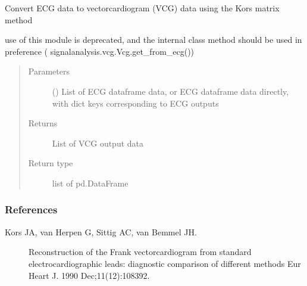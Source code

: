 \documentclass[letterpaper,10pt,english]{sphinxmanual}
\begin{document}
\begin{fulllineitems}
\label{\detokenize{_autosummary/signalanalysis.vcg.get_vcg_from_ecg:signalanalysis.vcg.get_vcg_from_ecg}}
\sphinxAtStartPar
Convert ECG data to vectorcardiogram (VCG) data using the Kors matrix method

\sphinxAtStartPar
{}use of this module is deprecated, and the internal class method should be used in preference (
signalanalysis.vcg.Vcg.get\_from\_ecg())
\begin{quote}\begin{description}
\item[{Parameters}] \leavevmode
\sphinxAtStartPar
{} () \textendash{} List of ECG dataframe data, or ECG dataframe data directly, with dict keys corresponding to ECG outputs

\item[{Returns}] \leavevmode
\sphinxAtStartPar
{} \textendash{} List of VCG output data

\item[{Return type}] \leavevmode
\sphinxAtStartPar
list of pd.DataFrame

\end{description}\end{quote}
\subsubsection*{References}
\begin{description}
\item[{Kors JA, van Herpen G, Sittig AC, van Bemmel JH.}] \leavevmode
\sphinxAtStartPar
Reconstruction of the Frank vectorcardiogram from standard electrocardiographic leads: diagnostic comparison
of different methods
Eur Heart J. 1990 Dec;11(12):1083\sphinxhyphen{}92.

\end{description}

\end{fulllineitems}
\end{document}
